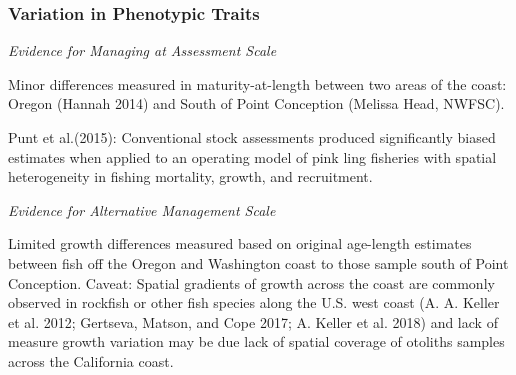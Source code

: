 \documentclass[11pt,
  english,
  a4paper,
]{article}
\begin{document}
\leavevmode\tagmcend\tagstructend\par


\hypertarget{variation-in-phenotypic-traits}{%
\subsubsection{Variation in Phenotypic Traits}\label{variation-in-phenotypic-traits}}

\leavevmode\tagmcend\tagstructend


\emph{Evidence for Managing at Assessment Scale}

\leavevmode\tagmcend\tagstructend\par


Minor differences measured in maturity-at-length between two areas of the coast: Oregon {(Hannah 2014)\leavevmode\tagmcend\tagstructend} and South of Point Conception (Melissa Head, NWFSC).

\leavevmode\tagmcend\tagstructend\par


Punt et al.{(2015)\leavevmode\tagmcend\tagstructend}: Conventional stock assessments produced significantly biased estimates when applied to an operating model of pink ling fisheries with spatial heterogeneity in fishing mortality, growth, and recruitment.

\leavevmode\tagmcend\tagstructend\par


\emph{Evidence for Alternative Management Scale}

\leavevmode\tagmcend\tagstructend\par


Limited growth differences measured based on original age-length estimates between fish off the Oregon and Washington coast to those sample south of Point Conception. Caveat: Spatial gradients of growth across the coast are commonly observed in rockfish or other fish species along the U.S. west coast {(A. A. Keller et al. 2012; Gertseva, Matson, and Cope 2017; A. Keller et al. 2018)\leavevmode\tagmcend\tagstructend} and lack of measure growth variation may be due lack of spatial coverage of otoliths samples across the California coast.
\end{document}
